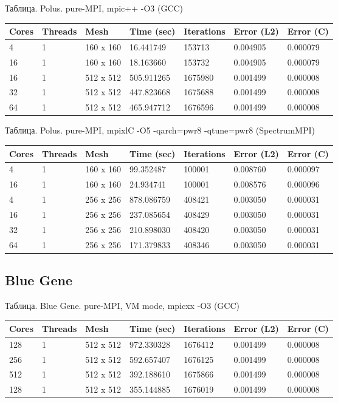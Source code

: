 \documentclass[12pt]{article}
\begin{document}
Таблица. Polus. pure-MPI, mpic++ -O3 (GCC)
\begin{center}
\begin{tabular}{lllllll}
Cores & Threads & Mesh & Time (sec) & Iterations & Error (L2) & Error (C) \\
\hline
4 & 1 & 160 x 160 & 16.441749 & 153713 & 0.004905 & 0.000079  \\
16 & 1 & 160 x 160 & 18.163660 & 153732 & 0.004905 & 0.000079 \\
\hline
16 & 1 & 512 x 512 & 505.911265 & 1675980 & 0.001499 & 0.000008 \\
32 & 1 & 512 x 512 & 447.823668 & 1675688 & 0.001499 & 0.000008 \\
64 & 1 & 512 x 512 & 465.947712 & 1676596 & 0.001499 & 0.000008 \\
\hline
\end{tabular}
\end{center}

Таблица. Polus. pure-MPI, mpixlC -O5 -qarch=pwr8 -qtune=pwr8 (SpectrumMPI)
\begin{center}
\begin{tabular}{lllllll}
Cores & Threads & Mesh & Time (sec) & Iterations & Error (L2) & Error (C) \\
\hline
4 & 1 & 160 x 160 & 99.352487 & 100001 & 0.008760 & 0.000097 \\
16 & 1 & 160 x 160 & 24.934741 & 100001 & 0.008576 & 0.000096 \\
\hline
4 & 1 & 256 x 256 & 878.086759 & 408421 & 0.003050 & 0.000031  \\
16 & 1 & 256 x 256 & 237.085654 & 408429 & 0.003050 & 0.000031 \\
32 & 1 & 256 x 256 & 210.898030 & 408420 & 0.003050 & 0.000031 \\
64 & 1 & 256 x 256 & 171.379833 & 408346 & 0.003050 & 0.000031 \\
\hline
\end{tabular}
\end{center}

\subsection{Blue Gene}

Таблица. Blue Gene. pure-MPI, VM mode, mpicxx -O3 (GCC)
\begin{center}
\begin{tabular}{lllllll}
Cores & Threads & Mesh & Time (sec) & Iterations & Error (L2) & Error (C) \\
\hline
128 & 1 & 512 x 512 & 972.330328 & 1676412 & 0.001499 & 0.000008 \\
256 & 1 & 512 x 512 & 592.657407 & 1676125 & 0.001499 & 0.000008 \\
512 & 1 & 512 x 512 & 392.188610 & 1675866 & 0.001499 & 0.000008 \\
\hline
128 & 1 & 512 x 512 & 355.144885 & 1676019 & 0.001499 & 0.000008 \\
\end{tabular}
\end{center}
\end{document}
